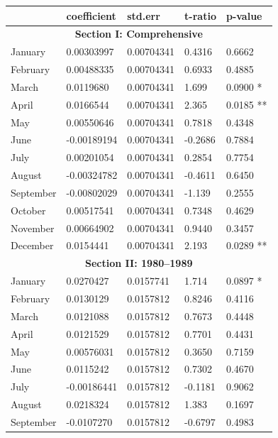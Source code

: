 \documentclass[11pt, english]{article}
\begin{document}
	\begin{center}
		\scriptsize
	\begin{longtable}{p{2cm}p{2cm}p{2cm}p{2cm}p{2cm}}
		& \textbf{coefficient} & \textbf{std.err} & \textbf{t-ratio} & \textbf{p-value}\\
		\hline
		\multicolumn{5}{c}{\textbf{Section I: Comprehensive}}\\
		\hline
		January & 0.00303997 & 0.00704341 & 0.4316 & 0.6662\\
		February & 0.00488335 & 0.00704341 & 0.6933 & 0.4885\\
		March & 0.0119680 & 0.00704341 & 1.699 & 0.0900 *\\
		April & 0.0166544 & 0.00704341 & 2.365 & 0.0185 **\\
		May & 0.00550646 & 0.00704341 & 0.7818 & 0.4348\\
		June & -0.00189194 & 0.00704341 & -0.2686 & 0.7884\\
		July & 0.00201054 & 0.00704341 & 0.2854 & 0.7754\\
		August & -0.00324782 & 0.00704341 & -0.4611 & 0.6450\\
		September & -0.00802029 & 0.00704341 & -1.139 & 0.2555\\
		October & 0.00517541 & 0.00704341 & 0.7348 & 0.4629\\
		November & 0.00664902 & 0.00704341 & 0.9440 & 0.3457\\
		December & 0.0154441 & 0.00704341 & 2.193 & 0.0289 **\\
		\hline
		\multicolumn{5}{c}{\textbf{Section II: 1980--1989}}\\
		\hline
		January & 0.0270427 & 0.0157741 & 1.714 & 0.0897 *\\                   
                February & 0.0130129 & 0.0157812 & 0.8246 & 0.4116\\
                March & 0.0121088 & 0.0157812 & 0.7673 & 0.4448\\
                April & 0.0121529 & 0.0157812 & 0.7701 & 0.4431\\
                May & 0.00576031 & 0.0157812 & 0.3650 & 0.7159\\
                June & 0.0115242 & 0.0157812 & 0.7302 & 0.4670\\
                July & -0.00186441 & 0.0157812 & -0.1181 & 0.9062\\
                August & 0.0218324 & 0.0157812 & 1.383 & 0.1697\\
                September & -0.0107270 & 0.0157812 & -0.6797 & 0.4983\\

\end{longtable}
\end{center}
\end{document}
